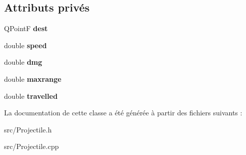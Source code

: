 \subsection*{Attributs privés}
\begin{DoxyCompactItemize}
\item 
\hypertarget{classProjectile_a15091a3a02fbfac2dd4fb44ac9cbceab}{
QPointF {\bfseries dest}}
\label{classProjectile_a15091a3a02fbfac2dd4fb44ac9cbceab}

\item 
\hypertarget{classProjectile_aae1f5d683c71d152b6a12d922ec4714f}{
double {\bfseries speed}}
\label{classProjectile_aae1f5d683c71d152b6a12d922ec4714f}

\item 
\hypertarget{classProjectile_ac94938ed5b3d3e01217bf72f80ad2e3d}{
double {\bfseries dmg}}
\label{classProjectile_ac94938ed5b3d3e01217bf72f80ad2e3d}

\item 
\hypertarget{classProjectile_a019db4c89ccf3eb291b06ba7b55f0754}{
double {\bfseries maxrange}}
\label{classProjectile_a019db4c89ccf3eb291b06ba7b55f0754}

\item 
\hypertarget{classProjectile_a0fc0c0258f36a9347f45d1edb8b767e5}{
double {\bfseries travelled}}
\label{classProjectile_a0fc0c0258f36a9347f45d1edb8b767e5}

\end{DoxyCompactItemize}


La documentation de cette classe a été générée à partir des fichiers suivants :\begin{DoxyCompactItemize}
\item 
src/Projectile.h\item 
src/Projectile.cpp\end{DoxyCompactItemize}

